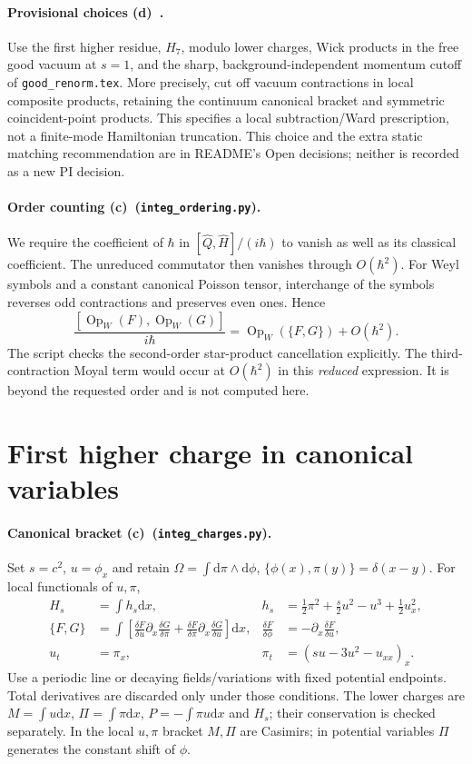 \documentclass[11pt,a4paper]{article}
\newcommand{\C}{\textbf{(c)}\ }
\newcommand{\D}{\textbf{(d)}\ }
\newcommand{\dd}{\mathrm d}
\newcommand{\file}[1]{\nolinkurl{#1}}
\newcommand{\chg}{\file{integ_charges.py}}
\newcommand{\ord}{\file{integ_ordering.py}}
\begin{document}
\paragraph{Provisional choices \D.}
Use the first higher residue, $H_7$, modulo lower charges, Wick products
in the free good vacuum at $s=1$, and the sharp, background-independent
momentum cutoff of \file{good_renorm.tex}. More precisely, cut off vacuum
contractions in local composite products, retaining the continuum canonical
bracket and symmetric coincident-point products. This specifies a local
subtraction/Ward prescription, not a finite-mode Hamiltonian truncation.
This choice and the extra static matching recommendation are in README's
Open decisions; neither is recorded as a new PI decision.

\paragraph{Order counting \C (\ord).}
We require the coefficient of $\hbar$ in
$[\widehat Q,\widehat H]/(i\hbar)$ to vanish as well as its classical
coefficient. The unreduced commutator then vanishes through $O(\hbar^2)$.
For Weyl symbols and a constant canonical Poisson tensor, interchange of
the symbols reverses odd contractions and preserves even ones. Hence
\begin{equation}
 \frac{[\operatorname{Op}_W(F),\operatorname{Op}_W(G)]}{i\hbar}
 =\operatorname{Op}_W(\{F,G\})+O(\hbar^2).\label{weyl}
\end{equation}
The script checks the second-order star-product cancellation explicitly.
The third-contraction Moyal term would occur at $O(\hbar^2)$ in this
\emph{reduced} expression. It is beyond the requested order and is not
computed here.

\section{First higher charge in canonical variables}
\paragraph{Canonical bracket \C (\chg).}
Set $s=c^2$, $u=\phi_x$ and retain
$\Omega=\int\dd\pi\wedge\dd\phi$, $\{\phi(x),\pi(y)\}=\delta(x-y)$.
For local functionals of $u,\pi$,
\begin{align}
 H_s&=\int h_s\dd x,&h_s&=\tfrac12\pi^2+\tfrac{s}{2}u^2-u^3+\tfrac12u_x^2,\\
 \{F,G\}&=\int\left[
 \frac{\delta F}{\delta u}\partial_x\frac{\delta G}{\delta\pi}
 +\frac{\delta F}{\delta\pi}\partial_x\frac{\delta G}{\delta u}\right]\dd x,
 &\frac{\delta F}{\delta\phi}&=-\partial_x\frac{\delta F}{\delta u},\\
 u_t&=\pi_x,&\pi_t&=(su-3u^2-u_{xx})_x.\label{flow}
\end{align}
Use a periodic line or decaying fields/variations with fixed potential
endpoints. Total derivatives are discarded only under those conditions.
The lower charges are $M=\int u\dd x$, $\Pi=\int\pi\dd x$,
$P=-\int\pi u\dd x$ and $H_s$; their conservation is checked separately.
In the local $u,\pi$ bracket $M,\Pi$ are Casimirs; in potential variables
$\Pi$ generates the constant shift of $\phi$.
\end{document}
